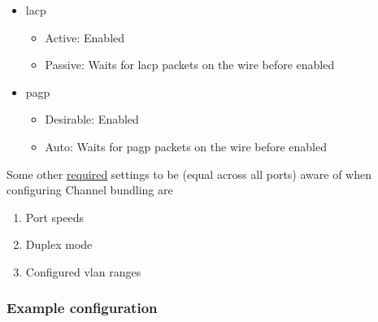 \begin{itemize}
    \item \gls{lacp}
    \begin{itemize}
        \item Active: Enabled
        \item Passive: Waits for \gls{lacp} packets on the wire before enabled
    \end{itemize}
    \item \gls{pagp}
    \begin{itemize}
        \item Desirable: Enabled
        \item Auto: Waits for \gls{pagp} packets on the wire before enabled
    \end{itemize}
\end{itemize}

Some other \underline{required} settings to be (equal across all ports) aware of when configuring Channel bundling are
\begin{enumerate}
    \item Port speeds
    \item Duplex mode
    \item Configured \gls{vlan} ranges
\end{enumerate}

\subsubsection{Example configuration}
